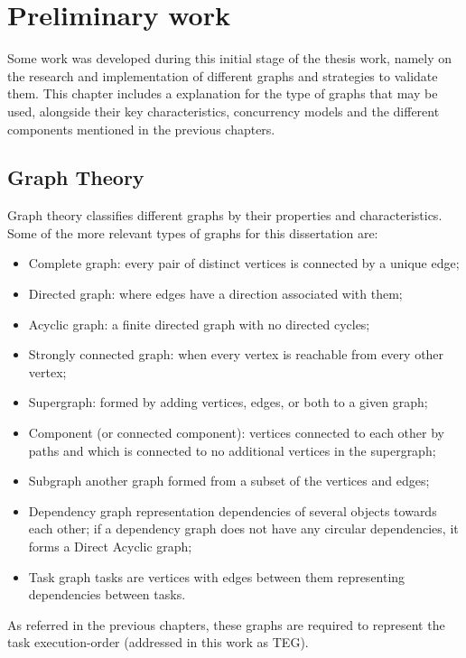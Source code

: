 \chapter{Preliminary work}
Some work was developed during this initial stage of the thesis work, namely on the research and implementation of different graphs and strategies to validate them.
This chapter includes a explanation for the type of graphs that may be used, alongside their key characteristics, concurrency models and the different components mentioned in the previous chapters.

\section{Graph Theory}

Graph theory classifies different graphs by their properties and characteristics. Some of the more relevant types of graphs for this dissertation are: 
\begin{itemize}
    \item Complete graph: every pair of distinct vertices is connected by a unique edge;
    \item Directed graph: where edges have a direction associated with them;
    \item Acyclic graph: a finite directed graph with no directed cycles;
    \item Strongly connected graph: when every vertex is reachable from every other vertex;
    \item Supergraph:  formed by adding vertices, edges, or both to a given graph;
    \item Component (or connected component): vertices connected to each other by paths and which is connected to no additional vertices in the supergraph;
    \item Subgraph another graph formed from a subset of the vertices and edges;
    \item Dependency graph representation dependencies of several objects towards each other; if a dependency graph does not have any circular dependencies, it forms a Direct Acyclic graph;
    \item Task graph tasks are vertices with edges between them representing dependencies between tasks.
\end{itemize}

As referred in the previous chapters, these graphs are required to represent the task execution-order (addressed in this work as TEG).

